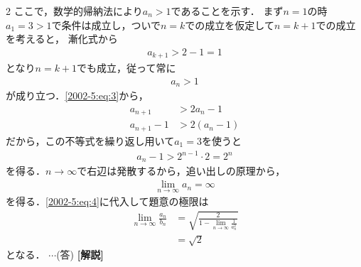 \documentclass[../../../../main.tex]{subfiles}
\begin{document}
\begin{multicols}{2}
    ここで，数学的帰納法により$a_n>1$であることを示す．
    まず$n=1$の時$a_1=3>1$で条件は成立し，ついで$n=k$での成立を仮定して$n=k+1$での成立を考えると，
    漸化式から
    \begin{align*}
        a_{k+1} > 2-1=1
    \end{align*}
    となり$n=k+1$でも成立，従って常に
    \begin{align*}
        a_n>1
    \end{align*}
    が成り立つ．\cref{2002-5:eq:3}から，
    \begin{align*}
        a_{n+1}   & > 2a_n -1             \\
        a_{n+1}-1 & >2 \left(a_n-1\right)
    \end{align*}
    だから，この不等式を繰り返し用いて$a_1=3$を使うと
    \begin{align*}
        a_n-1 > 2^{n-1}\cdot 2 = 2^n
    \end{align*}
    を得る．$n\to\infty$で右辺は発散するから，追い出しの原理から，
    \begin{align*}
        \lim_{n\to\infty} a_n = \infty
    \end{align*}
    を得る．\cref{2002-5:eq:4}に代入して題意の極限は
    \begin{align*}
        \lim_{n\to\infty}\frac{a_n}{b_n}
         & = \sqrt{\frac{2}{1-\lim_{n\to\infty}\frac{1}{a^2_n}}} \\
         & = \sqrt{2}
    \end{align*}
    となる．    $\cdots$(答)
    {\bf[解説]}

    \newpage
\end{multicols}
\end{document}
